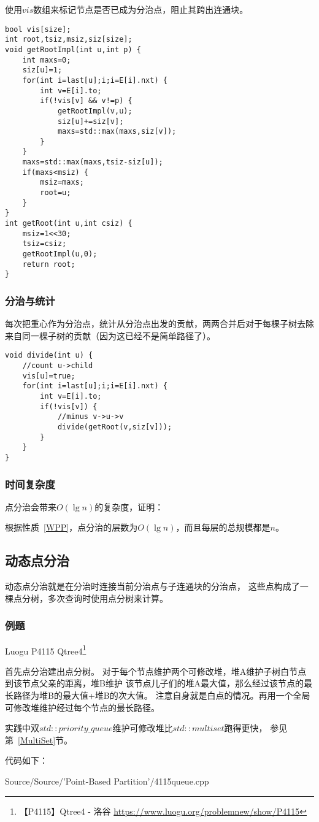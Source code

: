 使用$vis$数组来标记节点是否已成为分治点，阻止其跨出连通块。

\begin{lstlisting}[title=getRoot]
bool vis[size];
int root,tsiz,msiz,siz[size];
void getRootImpl(int u,int p) {
    int maxs=0;
    siz[u]=1;
    for(int i=last[u];i;i=E[i].nxt) {
        int v=E[i].to;
        if(!vis[v] && v!=p) {
            getRootImpl(v,u);
            siz[u]+=siz[v];
            maxs=std::max(maxs,siz[v]);
        }
    }
    maxs=std::max(maxs,tsiz-siz[u]);
    if(maxs<msiz) {
        msiz=maxs;
        root=u;
    }
}
int getRoot(int u,int csiz) {
    msiz=1<<30;
    tsiz=csiz;
    getRootImpl(u,0);
    return root;
}
\end{lstlisting}

\subsubsection{分治与统计}
每次把重心作为分治点，统计从分治点出发的贡献，两两合并后对于每棵子树去除
来自同一棵子树的贡献（因为这已经不是简单路径了）。

\begin{lstlisting}[title=divide]
void divide(int u) {
    //count u->child
    vis[u]=true;
    for(int i=last[u];i;i=E[i].nxt) {
        int v=E[i].to;
        if(!vis[v]) {
            //minus v->u->v
            divide(getRoot(v,siz[v]));
        }
    }
}
\end{lstlisting}

\subsubsection{时间复杂度}
点分治会带来$O(\lg n)$的复杂度，证明：

根据性质~\ref{WPP}，点分治的层数为$O(\lg n)$，而且每层的总规模都是$n$。

\subsection{动态点分治}
动态点分治就是在分治时连接当前分治点与子连通块的分治点，
这些点构成了一棵点分树，多次查询时使用点分树来计算。

\subsubsection{例题}

Luogu P4115 Qtree4\footnote{【P4115】Qtree4 - 洛谷
\url{https://www.luogu.org/problemnew/show/P4115}}

首先点分治建出点分树。
对于每个节点维护两个可修改堆，堆A维护子树白节点到该节点父亲的距离，堆B维护
该节点儿子们的堆A最大值，那么经过该节点的最长路径为堆B的最大值+堆B的次大值。
注意自身就是白点的情况。再用一个全局可修改堆维护经过每个节点的最长路径。

实践中双$std::priority\_queue$维护可修改堆比$std::multiset$跑得更快，
参见第~\ref{MultiSet}节。

代码如下：

{Source/Source/'Point-Based Partition'/4115queue.cpp}
